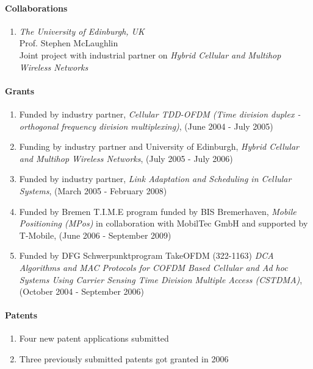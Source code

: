 \paragraph{Collaborations}
\begin{enumerate}
\item {\sl The University of Edinburgh, UK}\\
  Prof. Stephen McLaughlin\\
  Joint project with industrial partner on \emph{Hybrid Cellular and Multihop Wireless
    Networks}
\end{enumerate}


\paragraph{Grants}
\begin{enumerate}
    \item Funded by industry partner,
      \emph{Cellular TDD-OFDM (Time division duplex - orthogonal frequency
          division multiplexing)}, (June 2004 - July 2005)\\


    \item Funding by industry partner and University of Edinburgh, \emph{Hybrid Cellular and Multihop Wireless
    Networks}, (July 2005 - July 2006)

    \item Funded by industry partner, \emph{Link Adaptation and Scheduling in Cellular
    Systems}, (March 2005 - February 2008)\\

    \item Funded by Bremen T.I.M.E program funded by BIS
    Bremerhaven, \emph{Mobile Positioning (MPos)} in collaboration with MobilTec GmbH and supported by
     T-Mobile, (June 2006 - September 2009)

    \item Funded by DFG Schwerpunktprogram TakeOFDM (322-1163) \emph{DCA Algorithms and MAC Protocols for COFDM Based Cellular and
     Ad hoc Systems Using Carrier Sensing Time Division Multiple Access
     (CSTDMA)}, (October 2004 - September 2006)
     
\end{enumerate}

\paragraph{Patents}
\begin{enumerate}
\item Four new patent applications submitted
\item Three previously submitted patents got granted in 2006
\end{enumerate}

